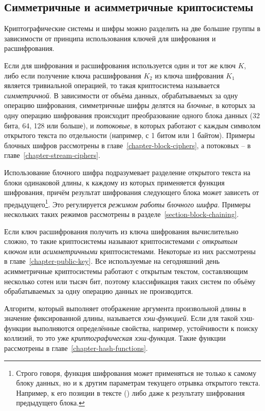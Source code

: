 \subsection{Симметричные и асимметричные криптосистемы}

Криптографические системы и шифры можно разделить на две большие группы в зависимости от принципа использования ключей для шифрования и расшифрования.

Если для шифрования и расшифрования используется один и тот же ключ $K$, либо если получение ключа расшифрования $K_2$ из ключа шифрования $K_1$ является тривиальной операцией, то такая криптосистема называется \emph{симметричной}. В зависимости от объёма данных, обрабатываемых за одну операцию шифрования, симметричные шифры делятся на \emph{блочные}, в которых за одну операцию шифрования происходит преобразование одного блока данных (32 бита, 64, 128 или больше), и \emph{потоковые}, в которых работают с каждым символом открытого текста по отдельности (например, с 1 битом или 1 байтом). Примеры блочных шифров рассмотрены в главе~\ref{chapter-block-ciphers}, а потоковых -- в главе~\ref{chapter-stream-ciphers}.

Использование блочного шифра подразумевает разделение открытого текста на блоки одинаковой длины, к каждому из которых применяется функция шифрования, причём результат шифрования следующего блока может зависеть от предыдущего\footnote{Строго говоря, функция шифрования может применяться не только к самому блоку данных, но и к другим параметрам текущего отрывка открытого текста. Например, к его позиции в тексте () либо даже к результату шифрования предыдущего блока.}. Это регулируется \emph{режимом работы блочного шифра}. Примеры нескольких таких режимов рассмотрены в разделе~\ref{section-block-chaining}.

Если ключ расшифрования получить из ключа шифрования вычислительно сложно, то такие криптосистемы называют криптосистемами \emph{с открытым ключом} или \emph{асимметричными} криптосистемами. Некоторые из них рассмотрены в главе~\ref{chapter-public-key}. Все используемые на сегодняшний день асимметричные криптосистемы работают с открытым текстом, составляющим несколько сотен или тысяч бит, поэтому классификация таких систем по объёму обрабатываемых за одну операцию данных не производится.

Алгоритм, который выполняет отображение аргумента произвольной длины в значение фиксированной длины, называется \emph{хэш-функцией}. Если для такой хэш-функции выполняются определённые свойства, например, устойчивости к поиску коллизий, то это уже \emph{криптографическая хэш-функция}. Такие функции рассмотрены в главе~\ref{chapter-hash-functions}.

